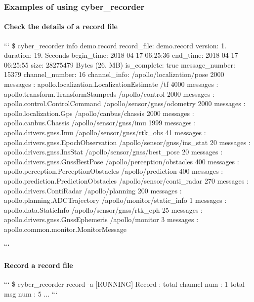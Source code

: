 \subsubsection*{Examples of using cyber\-\_\-recorder}

\paragraph*{Check the details of a record file}

``` \$ cyber\-\_\-recorder info demo.\-record record\-\_\-file\-: demo.\-record version\-: 1. duration\-: 19. Seconds begin\-\_\-time\-: 2018-\/04-\/17 06\-:25\-:36 end\-\_\-time\-: 2018-\/04-\/17 06\-:25\-:55 size\-: 28275479 Bytes (26. M\-B) is\-\_\-complete\-: true message\-\_\-number\-: 15379 channel\-\_\-number\-: 16 channel\-\_\-info\-: /apollo/localization/pose 2000 messages \-: apollo.\-localization.\-Localization\-Estimate /tf 4000 messages \-: apollo.\-transform.\-Transform\-Stampeds /apollo/control 2000 messages \-: apollo.\-control.\-Control\-Command /apollo/sensor/gnss/odometry 2000 messages \-: apollo.\-localization.\-Gps /apollo/canbus/chassis 2000 messages \-: apollo.\-canbus.\-Chassis /apollo/sensor/gnss/imu 1999 messages \-: apollo.\-drivers.\-gnss.\-Imu /apollo/sensor/gnss/rtk\-\_\-obs 41 messages \-: apollo.\-drivers.\-gnss.\-Epoch\-Observation /apollo/sensor/gnss/ins\-\_\-stat 20 messages \-: apollo.\-drivers.\-gnss.\-Ins\-Stat /apollo/sensor/gnss/best\-\_\-pose 20 messages \-: apollo.\-drivers.\-gnss.\-Gnss\-Best\-Pose /apollo/perception/obstacles 400 messages \-: apollo.\-perception.\-Perception\-Obstacles /apollo/prediction 400 messages \-: apollo.\-prediction.\-Prediction\-Obstacles /apollo/sensor/conti\-\_\-radar 270 messages \-: apollo.\-drivers.\-Conti\-Radar /apollo/planning 200 messages \-: apollo.\-planning.\-A\-D\-C\-Trajectory /apollo/monitor/static\-\_\-info 1 messages \-: apollo.\-data.\-Static\-Info /apollo/sensor/gnss/rtk\-\_\-eph 25 messages \-: apollo.\-drivers.\-gnss.\-Gnss\-Ephemeris /apollo/monitor 3 messages \-: apollo.\-common.\-monitor.\-Monitor\-Message

```

\paragraph*{Record a record file}

``` \$ cyber\-\_\-recorder record -\/a \mbox{[}R\-U\-N\-N\-I\-N\-G\mbox{]} Record \-: total channel num \-: 1 total msg num \-: 5 ... ```

